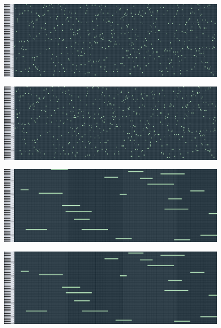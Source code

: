 \documentclass[conference]{IEEEtran}
\begin{document}
\begin{figure}
\centering
\begin{minipage}{.5\textwidth}
  \centering
  \includegraphics[width=.9\linewidth]{fitness1-first-full.png}
  \label{fig:test1}
\end{minipage}%
\begin{minipage}{.5\textwidth}
  \centering
  \includegraphics[width=.9\linewidth]{fitness1-final-full.png}
  \label{fig:test2}
\end{minipage}


\centering
\begin{minipage}{.5\textwidth}
  \centering
  \includegraphics[width=.9\linewidth]{fitness2-first-30.png}
  \label{fig:test1}
\end{minipage}%
\begin{minipage}{.5\textwidth}
  \centering
  \includegraphics[width=.9\linewidth]{fitness2-final-30.png}
  \label{fig:test2}
\end{minipage}


\end{figure}
\end{document}
